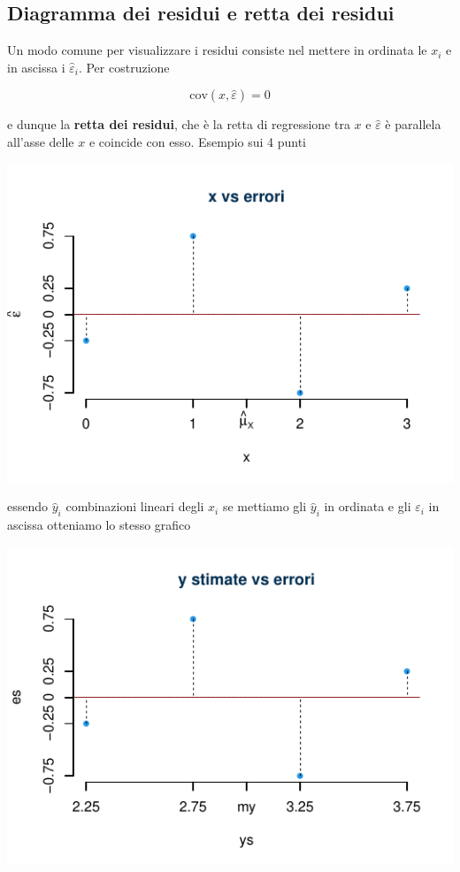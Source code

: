 \documentclass[
  11pt,
]{book}
\theoremstyle{mytheoremstyle}
\theoremstyle{mydefstyle}
\begin{document}
\subsection{Diagramma dei residui e retta dei residui}\label{diagramma-dei-residui-e-retta-dei-residui}

Un modo comune per visualizzare i residui consiste nel mettere in ordinata
le \(x_i\) e in ascissa i \(\hat\varepsilon_i\).
Per costruzione

\[\text{cov}(x,\hat\varepsilon)=0\]

e dunque la \textbf{retta dei residui}, che è la retta di regressione tra \(x\) e
\(\hat\varepsilon\) è parallela all'asse delle \(x\) e coincide con esso.
Esempio sui 4 punti

\begin{center}\includegraphics{Appunti_di_Statistica_2025_files/figure-latex/18-regressione-II-11-1} \end{center}

essendo \(\hat y_i\) combinazioni lineari degli \(x_i\) se mettiamo gli \(\hat y_i\) in ordinata
e gli \(\varepsilon_i\) in ascissa otteniamo lo stesso grafico

\begin{center}\includegraphics{Appunti_di_Statistica_2025_files/figure-latex/18-regressione-II-12-1} \end{center}
\end{document}
